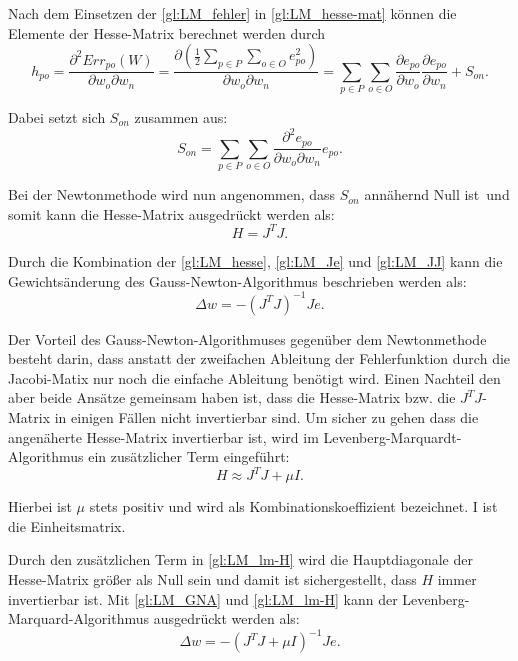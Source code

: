 Nach dem Einsetzen der \autoref{gl:LM_fehler} in \autoref{gl:LM_hesse-mat} können die Elemente der Hesse-Matrix berechnet werden durch
\begin{equation}
h_{po} = \frac{\partial^2 Err_{po}(W)}{\partial w_{o} \partial w_{n}} = \frac{\partial \left (\frac{1}{2} \sum_{p \in P} \sum_{o \in O} e_{po}^2 \right )}{\partial w_{o} \partial w_{n}} 
=
\sum_{p \in P} \sum_{o \in O} \frac{\partial e_{po}}{\partial w_{o}} \frac{\partial e_{po}}{\partial w_{n}} + S_{on}.
\label{gl:LM-h}
\end{equation}

Dabei setzt sich $S_{on}$ zusammen aus:
\begin{equation}
S_{on} = \sum_{p \in P} \sum_{o \in O} \frac{\partial^2 e_{po}}{\partial w_{o} \partial w_{n}} e_{po}.
\label{gl:LM_S}
\end{equation}

Bei der Newtonmethode wird nun angenommen, dass $S_{on}$ annähernd Null ist\, und somit kann die Hesse-Matrix ausgedrückt werden als:
\begin{equation}
H = J^T J.
\label{gl:LM_JJ}
\end{equation}

Durch die Kombination der \autoref{gl:LM_hesse}, \autoref{gl:LM_Je} und \autoref{gl:LM_JJ} kann die Gewichtsänderung des Gauss-Newton-Algorithmus beschrieben werden als:
\begin{equation}
\Delta w =-(J^T J)^{-1} J e.
\label{gl:LM_GNA}
\end{equation}

Der Vorteil des Gauss-Newton-Algorithmuses gegenüber dem Newtonmethode besteht darin, dass anstatt der zweifachen Ableitung der Fehlerfunktion durch die Jacobi-Matix nur noch die einfache Ableitung benötigt wird. Einen Nachteil den aber beide Ansätze gemeinsam haben ist, dass die Hesse-Matrix bzw. die $J^T J$-Matrix in einigen Fällen nicht invertierbar sind. Um sicher zu gehen dass die angenäherte Hesse-Matrix invertierbar ist, wird im Levenberg-Marquardt-Algorithmus ein zusätzlicher Term eingeführt:
\begin{equation}
H \approx J^T J + \mu I.
\label{gl:LM_lm-H}
\end{equation}

Hierbei ist $\mu$ stets positiv und wird als Kombinationskoeffizient bezeichnet. I ist die Einheitsmatrix.

Durch den zusätzlichen Term in \autoref{gl:LM_lm-H} wird die Hauptdiagonale der Hesse-Matrix größer als Null sein und damit ist sichergestellt, dass $H$ immer invertierbar ist. Mit \autoref{gl:LM_GNA} und \autoref{gl:LM_lm-H} kann der Levenberg-Marquard-Algorithmus ausgedrückt werden als:
\begin{equation}
\Delta w =-(J^T J + \mu I)^{-1} J e.
\label{gl:LM_lm-delta-w}
\end{equation}

